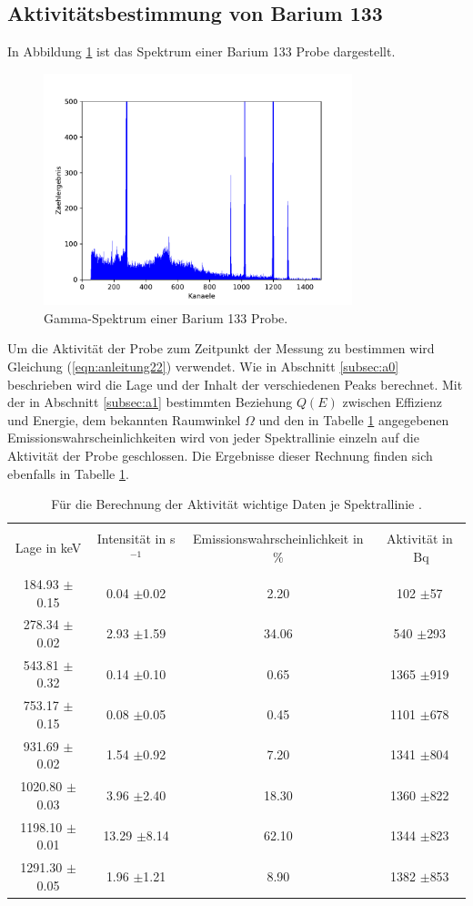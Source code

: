 \subsection{Aktivitätsbestimmung von Barium 133}
\label{subsec:a3}
In Abbildung \ref{fig:Spektrum_Barium} ist das Spektrum einer Barium 133 Probe dargestellt.
\begin{figure}
\centering
\includegraphics[width=0.8\textwidth]{python/plots/spec3.pdf}
\caption{Gamma-Spektrum einer Barium 133 Probe.}
\label{fig:Spektrum_Barium}
\end{figure}
Um die Aktivität der Probe zum Zeitpunkt der Messung zu bestimmen wird Gleichung (\ref{eqn:anleitung22}) verwendet.
Wie in Abschnitt \ref{subsec:a0} beschrieben wird die Lage und der Inhalt der verschiedenen Peaks berechnet.
Mit der in Abschnitt \ref{subsec:a1} bestimmten Beziehung $Q(E)$ zwischen Effizienz und Energie, dem bekannten Raumwinkel $\Omega$ und den in Tabelle \ref{tab:a_d_1} angegebenen Emissionswahrscheinlichkeiten wird von jeder Spektrallinie einzeln auf die Aktivität der Probe geschlossen.
Die Ergebnisse dieser Rechnung finden sich ebenfalls in Tabelle \ref{tab:a_d_1}.
\begin{table}
\centering
\caption{Für die Berechnung der Aktivität wichtige Daten je Spektrallinie \cite{sample}.}
\begin{tabular}{c c c c}
\hline \\
Lage in keV & Intensität in s$^{-1}$&  Emissionswahrscheinlichkeit in \%& Aktivität in $\SI{}{\becquerel}$\\
\hline \\
184.93 $\pm$0.15  &  0.04  $\pm$0.02  &  2.20  &  102  $\pm$57 \\ 278.34 $\pm$0.02  &  2.93  $\pm$1.59  &  34.06  &  540  $\pm$293 \\ 543.81 $\pm$0.32  &  0.14  $\pm$0.10  &  0.65  &  1365  $\pm$919 \\ 753.17 $\pm$0.15  &  0.08  $\pm$0.05  &  0.45  &  1101  $\pm$678 \\ 931.69 $\pm$0.02  &  1.54  $\pm$0.92  &  7.20  &  1341  $\pm$804 \\ 1020.80 $\pm$0.03  &  3.96  $\pm$2.40  &  18.30  &  1360  $\pm$822 \\ 1198.10 $\pm$0.01  &  13.29  $\pm$8.14  &  62.10  &  1344  $\pm$823 \\ 1291.30 $\pm$0.05  &  1.96  $\pm$1.21  &  8.90  &  1382  $\pm$853 \\ 
\hline
\end{tabular}
\label{tab:a_d_1}
\end{table}
